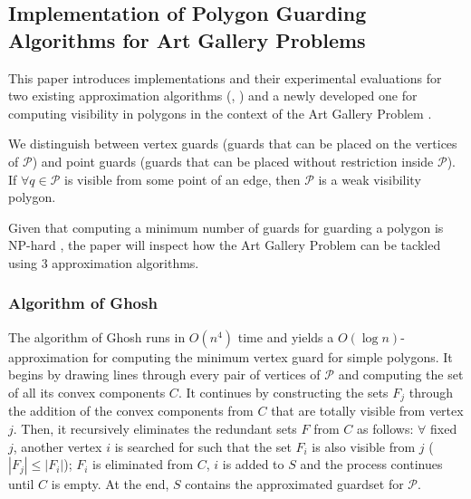 \subsection{Implementation of Polygon Guarding Algorithms for Art Gallery Problems \cite{maleki2022implementation}}
This paper \cite{maleki2022implementation} introduces implementations and their experimental evaluations for two existing approximation algorithms (\cite{GHOSH2010718}, \cite{bhattacharya2016approximability}) and a newly developed one for computing visibility in polygons in the context of the Art Gallery Problem \cite{o1987art}.

We distinguish between vertex guards (guards that can be placed on the vertices of $\mathcal P$) and point guards (guards that can be placed without restriction inside $\mathcal P$). If $\forall q \in \mathcal P$ is visible from some point of an edge, then $\mathcal P$ is a weak visibility polygon.

Given that computing a minimum number of guards for guarding a polygon is NP-hard \cite{1057165}, the paper will inspect how the Art Gallery Problem \cite{o1987art} can be tackled using 3 approximation algorithms.

\subsubsection{Algorithm of Ghosh \cite{GHOSH2010718}}
The algorithm of Ghosh \cite{GHOSH2010718} runs in $O(n^4)$ time and yields a $O(\log n)$-approximation for computing the minimum vertex guard for simple polygons. It begins by drawing lines through every pair of vertices of $\mathcal P$ and computing the set of all its convex components $C$. It continues by constructing the sets $F_j$ through the addition of the convex components from $C$ that are totally visible from vertex $j$. Then, it recursively eliminates the redundant sets $F$ from $C$ as follows: $\forall$ fixed $j$, another vertex $i$ is searched for such that the set $F_i$ is also visible from $j$ ($|F_j| \leq |F_i|$); $F_i$ is eliminated from $C$, $i$ is added to $S$ and the process continues until $C$ is empty. At the end, $S$ contains the approximated guardset for $\mathcal P$.

